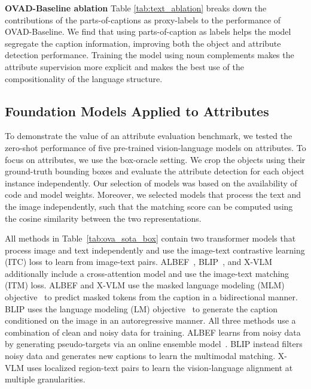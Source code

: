 \documentclass[10pt,twocolumn,letterpaper]{article}
\renewcommand\paragraph[1]{\vspace{0.12cm}\noindent\textbf{#1}}
\newcommand{\modelname}{OVAD-Baseline }
\newcommand{\modelnamenospace}{OVAD-Baseline}
\begin{document}
\paragraph{\modelname ablation}
Table \ref{tab:text_ablation} breaks down the contributions of the parts-of-captions as proxy-labels to the performance of \modelnamenospace{}.
We find that using parts-of-caption as labels helps the model segregate the caption information, improving both the object and attribute detection performance. 
Training the model using noun complements makes the attribute supervision more explicit and makes the best use of the compositionality of the language structure.  \subsection{Foundation Models Applied to Attributes}
To demonstrate the value of an attribute evaluation benchmark, we tested the zero-shot performance of five pre-trained vision-language models on attributes. 
To focus on attributes, we use the box-oracle setting. We crop the objects using their ground-truth bounding boxes and evaluate the attribute detection for each object instance independently.
Our selection of models was based on the availability of code and model weights.
Moreover, we selected models that process the text and the image independently, such that the matching score can be computed using the cosine similarity between the two representations. 


All methods in Table~\ref{tab:ova_sota_box} contain two transformer models that process image and text independently and use the image-text contrastive learning (ITC) loss to learn from image-text pairs.
ALBEF~\cite{albef}, BLIP~\cite{blip}, and X-VLM~\cite{xvlm} additionally include a cross-attention model and use the image-text matching (ITM) loss.
ALBEF and X-VLM use the masked language modeling (MLM) objective~\cite{bert} to predict masked tokens from the caption in a bidirectional manner.
BLIP uses the language modeling (LM) objective~\cite{mnih2008scalable} to generate the caption conditioned on the image in an autoregressive manner.
All three methods use a combination of clean and noisy data for training. ALBEF learns from noisy data by generating pseudo-targets via an online ensemble model~\cite{tarvainen2017mean}.
BLIP instead filters noisy data and generates new captions to learn the multimodal matching. X-VLM uses localized region-text pairs to learn the vision-language alignment at multiple granularities.
\end{document}

